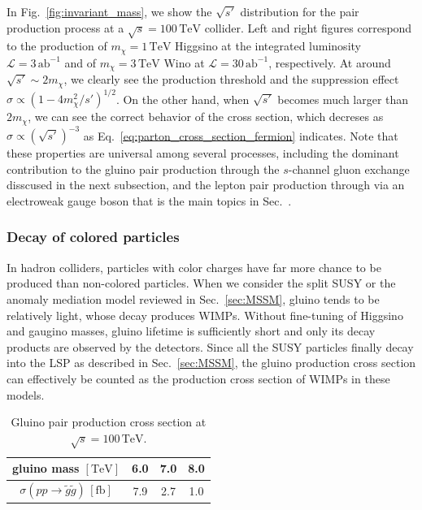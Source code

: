\documentclass[12pt,twoside,book]{article}
\begin{document}
In Fig.~\ref{fig:invariant_mass}, we show the $\sqrt{s'}$ distribution for the pair production process at a $\sqrt{s} = 100\,\mathrm{TeV}$ collider.
Left and right figures correspond to the production of $m_\chi = 1\,\mathrm{TeV}$ Higgsino at the integrated luminosity $\mathcal{L} = 3\,\mathrm{ab}^{-1}$ and of $m_\chi = 3\,\mathrm{TeV}$ Wino at $\mathcal{L} = 30\,\mathrm{ab}^{-1}$, respectively.
At around $\sqrt{s'} \sim 2 m_\chi$, we clearly see the production threshold and the suppression effect $\sigma \propto (1-4 m_\chi^2 / s')^{1/2}$.
On the other hand, when $\sqrt{s'}$ becomes much larger than $2m_\chi$, we can see the correct behavior of the cross section, which decreses as $\sigma \propto (\sqrt{s'})^{-3}$ as Eq.~\eqref{eq:parton_cross_section_fermion} indicates.
Note that these properties are universal among several processes, including the dominant contribution  to the gluino pair production through the $s$-channel gluon exchange disscused in the next subsection, and the lepton pair production through via an electroweak gauge boson that is the main topics in Sec.~.




\subsubsection*{Decay of colored particles}

In hadron colliders, particles with color charges have far more chance to be produced than non-colored particles.
When we consider the split SUSY or the anomaly mediation model reviewed in Sec.~\ref{sec:MSSM}, gluino tends to be relatively light, whose decay produces WIMPs.
Without fine-tuning of Higgsino and gaugino masses, gluino lifetime is sufficiently short and only its decay products are observed by the detectors.
Since all the SUSY particles finally decay into the LSP as described in Sec.~\ref{sec:MSSM}, the gluino production cross section can effectively be counted as the production cross section of WIMPs in these models.

\begin{table}[t]
  \centering
  \begin{tabular}{c|ccc}
    gluino mass $\mathrm{[TeV]}$ & 6.0 & 7.0 & 8.0 \\ \hline
    $\sigma(p p \to \tilde{g} \tilde{g})\, \mathrm{[fb]}$ & 7.9 & 2.7 & 1.0
  \end{tabular}
  \caption{Gluino pair production cross section at $\sqrt{s} = 100\,\mathrm{TeV}$.}
  \label{tab:gluino_pair}
\end{table}
\end{document}
